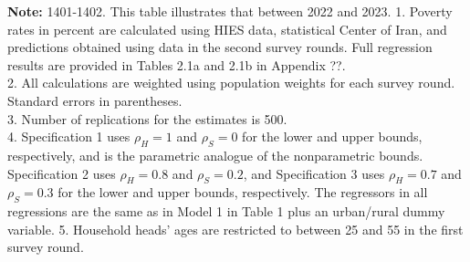 \documentclass[12pt,a4paper]{article}
\begin{document}
\begin{table}[H]
    \caption*{\scriptsize \textbf{Note:} 1401-1402.  This table illustrates that between 2022 and 2023.  1. Poverty rates in percent are calculated using HIES data, statistical Center of Iran, and predictions obtained using data in the second survey rounds.
Full regression results are provided in Tables 2.1a and 2.1b in Appendix ??. \\
2. All calculations are weighted using population weights for each survey round. Standard errors in parentheses.\\
3. Number of replications for the estimates is 500.\\
4. Specification 1 uses $\rho_H=1$ and $\rho_S=0$ for the lower and upper bounds, respectively, and is the parametric analogue of the nonparametric bounds. Specification 2
uses $\rho_H=0.8$ and $\rho_S=0.2$, and Specification 3 uses $\rho_H=0.7$ and $\rho_S=0.3$ for the lower and upper bounds, respectively. The regressors in all regressions are the
same as in Model 1 in Table 1 plus an urban/rural dummy variable.
5. Household heads' ages are restricted to between 25 and 55 in the first survey round.}
\end{table}
\end{document}
